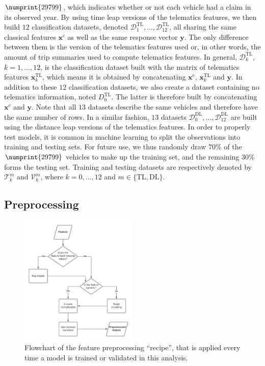 \documentclass{article}
\begin{document}
$\numprint{29799}$, which indicates whether or not each vehicle had a claim in its observed year. By using time leap versions of the telematics features, we then build $12$ classification datasets, denoted $\mathcal{D}_1^\text{TL}, \dots, \mathcal{D}_{12}^\text{TL}$, all sharing the same classical features $\boldsymbol{x}^c$ as well as the same response vector $\boldsymbol{y}$. The only difference between them is the version of the telematics features used or, in other words, the amount of trip summaries used to compute telematics features. In general, $\mathcal{D}_k^\text{TL}$, $k = 1, \dots, 12$, is the classification dataset built with the matrix of telematics features $\boldsymbol{x}_k^\text{TL}$, which means it is obtained by concatenating $\boldsymbol{x}^c$, $\boldsymbol{x}_k^\text{TL}$ and $\boldsymbol{y}$. In addition to these $12$ classification datasets, we also create a dataset containing no telematics information, noted $D_0^\text{TL}$. The latter is therefore built by concatenating $\boldsymbol{x}^c$ and $\boldsymbol{y}$. Note that all $13$ datasets describe the same vehicles and therefore have the same number of rows. In a similar fashion, $13$ datasets $\mathcal{D}_0^\text{DL}, \dots, \mathcal{D}_{12}^\text{DL}$ are built using the distance leap versions of the telematics features. In order to properly test models, it is common in machine learning to split the observations into training and testing sets. For future use, we thus randomly draw $70$\% of the $\numprint{29799}$ vehicles to make up the training set, and the remaining $30$\% forms the testing set. Training and testing datasets are respectively denoted by $\mathcal{T}_k^m$ and $\mathcal{V}_k^m$, where $k = 0, \dots, 12$ and $m \in \{\text{TL}, \text{DL}\}$.

\subsection{Preprocessing}

\begin{figure}
    \begin{center}
        \includegraphics[width=0.5\textwidth]{preprocessing_flow_chart.png}
    \end{center}
    \caption{Flowchart of the feature preprocessing ``recipe'', that is applied every time a model is trained or validated in this analysis.}
    \label{fig:preprocessing_flow_chart}
\end{figure}
\end{document}
